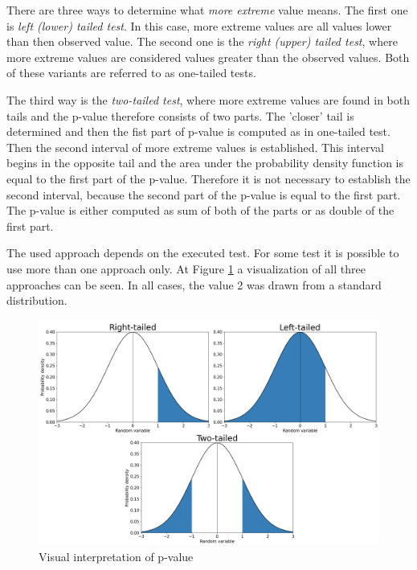 \documentclass[
  digital,     %
  oneside,     %
  nosansbold,  %
  nocolorbold, %
  nolof,         %
  nolot,         %
]{fithesis4}
\begin{document}
There are three ways to determine what \emph{more extreme} value means. The first one is \emph{left (lower) tailed test}. In this case, more extreme values are all values lower than then observed value. The second one is the \emph{right (upper) tailed test}, where more extreme values are considered values greater than the observed values. Both of these variants are referred to as one-tailed tests.

The third way is the \emph{two-tailed test}, where more extreme values are found in both tails and the p-value therefore consists of two parts. The 'closer' tail is determined and then the fist part of p-value is computed as in one-tailed test. Then the second interval of more extreme values is established. This interval begins in the opposite tail and the area under the probability density function is equal to the first part of the p-value. Therefore it is not necessary to establish the second interval, because the second part of the p-value is equal to the first part. The p-value is either computed as sum of both of the parts or as double of the first part. 

The used approach depends on the executed test. For some test it is possible to use more than one approach only. At Figure \ref{fig:p_value} a visualization of all three approaches can be seen. In all cases, the value 2 was drawn from a standard distribution.

\begin{figure}
  \begin{center}
    \includegraphics[width=12.5cm]{figures/p-value.png}
  \end{center}
  \caption{Visual interpretation of p-value }
  \label{fig:p_value}
\end{figure}
\end{document}
